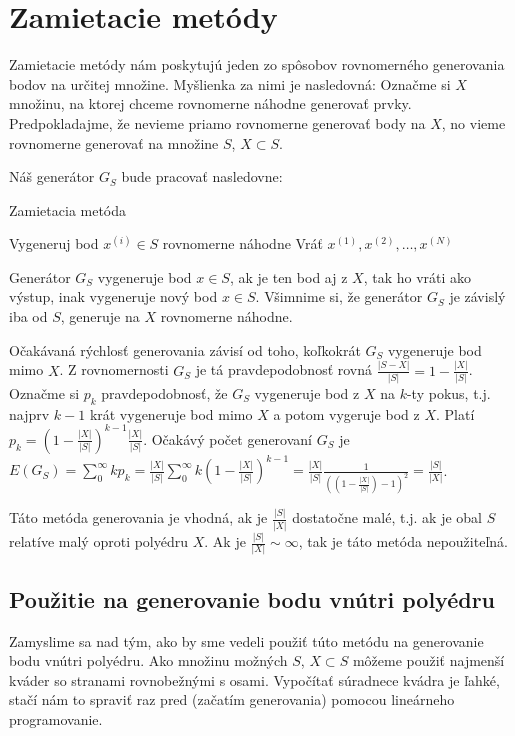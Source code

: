 \section{Zamietacie metódy}

Zamietacie metódy nám poskytujú jeden zo spôsobov rovnomerného generovania bodov na určitej množine.
Myšlienka za nimi je nasledovná: Označme si $X$ množinu, na ktorej chceme rovnomerne náhodne generovať prvky. Predpokladajme, že nevieme priamo rovnomerne generovať body na $X$, no vieme rovnomerne generovať na množine $S$, $X \subset S$.

Náš generátor $G_S$ bude pracovať nasledovne:

\begin{algorithm}[H]
	\caption{Zamietacia metóda}
	\label{zamietanie:basic}
	\begin{algorithmic}[1]
			\Repeat Vygeneruj bod $x^{(i)} \in S$ rovnomerne náhodne
		\EndFor
		\State Vráť ${x^{(1)},x^{(2)},\dots,x^{(N)}}$
	\end{algorithmic}
\end{algorithm}
Generátor $G_S$ vygeneruje bod $x \in S$, ak je ten bod aj z $X$, tak ho vráti ako výstup, inak vygeneruje nový bod $x \in S$. Všimnime si, že generátor $G_S$ je závislý iba od $S$, generuje na $X$ rovnomerne náhodne.

Očakávaná rýchlosť generovania závisí od toho, koľkokrát $G_S$ vygeneruje bod mimo $X$. Z rovnomernosti $G_S$ je tá pravdepodobnosť rovná $\frac{|S-X|}{|S|} = 1-\frac{|X|}{|S|}$. Označme si $p_k$ pravdepodobnosť, že $G_S$ vygeneruje bod z $X$ na $k$-ty pokus, t.j. najprv $k-1$ krát vygeneruje bod mimo $X$ a potom vygeruje bod z $X$. Platí $p_k= (1-\frac{|X|}{|S|})^{k-1}\frac{|X|}{|S|}$. Očakávý počet generovaní $G_S$ je $E(G_S)=\sum^{\infty}_{0}kp_k=\frac{|X|}{|S|} \sum^{\infty}_{0}k(1-\frac{|X|}{|S|})^{k-1}=\frac{|X|}{|S|} \frac{1}{((1-\frac{|X|}{|S|})-1)^2} = \frac{|S|}{|X|}$.

Táto metóda generovania je vhodná, ak je $\frac{|S|}{|X|}$ dostatočne malé, t.j. ak je obal $S$ relatíve malý oproti polyédru $X$. Ak je $\frac{|S|}{|X|} \sim \infty$, tak je táto metóda nepoužiteľná.

\subsection{Použitie na generovanie bodu vnútri polyédru}

Zamyslime sa nad tým, ako by sme vedeli použiť túto metódu na generovanie bodu vnútri polyédru. Ako množinu možných $S$, $X \subset S$ môžeme použiť najmenší kváder so stranami rovnobežnými s osami. Vypočítať súradnece kvádra je ľahké, stačí nám to spraviť raz pred (začatím generovania) pomocou lineárneho programovanie.

